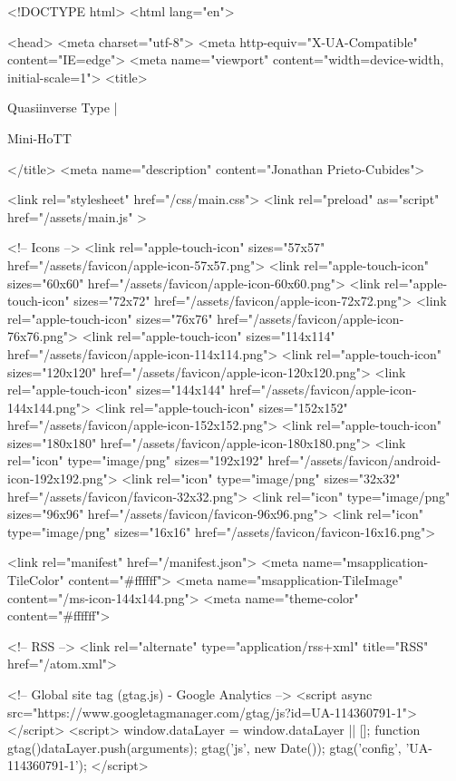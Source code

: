 <!DOCTYPE html>
<html lang="en">

<head>
  <meta charset="utf-8">
  <meta http-equiv="X-UA-Compatible" content="IE=edge">
  <meta name="viewport" content="width=device-width, initial-scale=1">
  <title>
    
      
        Quasiinverse Type |
      
        Mini-HoTT
    
  </title>
  <meta name="description" content="Jonathan Prieto-Cubides">

  <link rel="stylesheet" href="/css/main.css">
  <link rel="preload" as="script" href="/assets/main.js" >

  <!-- Icons -->
  <link rel="apple-touch-icon" sizes="57x57" href="/assets/favicon/apple-icon-57x57.png">
  <link rel="apple-touch-icon" sizes="60x60" href="/assets/favicon/apple-icon-60x60.png">
  <link rel="apple-touch-icon" sizes="72x72" href="/assets/favicon/apple-icon-72x72.png">
  <link rel="apple-touch-icon" sizes="76x76" href="/assets/favicon/apple-icon-76x76.png">
  <link rel="apple-touch-icon" sizes="114x114" href="/assets/favicon/apple-icon-114x114.png">
  <link rel="apple-touch-icon" sizes="120x120" href="/assets/favicon/apple-icon-120x120.png">
  <link rel="apple-touch-icon" sizes="144x144" href="/assets/favicon/apple-icon-144x144.png">
  <link rel="apple-touch-icon" sizes="152x152" href="/assets/favicon/apple-icon-152x152.png">
  <link rel="apple-touch-icon" sizes="180x180" href="/assets/favicon/apple-icon-180x180.png">
  <link rel="icon" type="image/png" sizes="192x192"  href="/assets/favicon/android-icon-192x192.png">
  <link rel="icon" type="image/png" sizes="32x32" href="/assets/favicon/favicon-32x32.png">
  <link rel="icon" type="image/png" sizes="96x96" href="/assets/favicon/favicon-96x96.png">
  <link rel="icon" type="image/png" sizes="16x16" href="/assets/favicon/favicon-16x16.png">

  <link rel="manifest" href="/manifest.json">
  <meta name="msapplication-TileColor" content="#ffffff">
  <meta name="msapplication-TileImage" content="/ms-icon-144x144.png">
  <meta name="theme-color" content="#ffffff">

  <!-- RSS -->
  <link rel="alternate" type="application/rss+xml" title="RSS" href="/atom.xml">

  <!-- Global site tag (gtag.js) - Google Analytics -->
  <script async src="https://www.googletagmanager.com/gtag/js?id=UA-114360791-1"></script>
  <script>
    window.dataLayer = window.dataLayer || [];
    function gtag(){dataLayer.push(arguments);}
    gtag('js', new Date());
    gtag('config', 'UA-114360791-1');
  </script>

